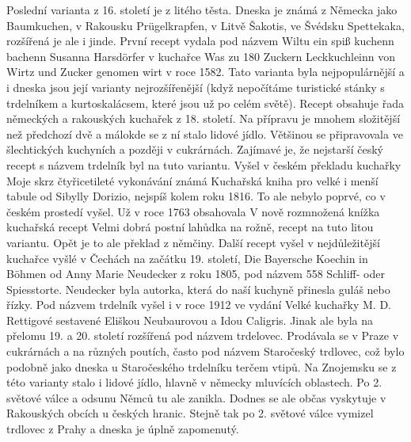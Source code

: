Poslední varianta z 16. století je z litého těsta. Dneska je známá z Německa jako Baumkuchen, v Rakousku Prügelkrapfen, v Litvě Šakotis, ve Švédsku Spettekaka, rozšířená je ale i jinde. První recept vydala pod názvem Wiltu ein spiß kuchenn bachenn Susanna Harsdörfer v kuchařce Was zu 180 Zuckern Leckkuchleinn von Wirtz und Zucker genomen wirt v roce 1582. Tato varianta byla nejpopulárnější a i dneska jsou její varianty nejrozšířenější (když nepočítáme turistické stánky s trdelníkem a kurtoskalácsem, které jsou už po celém světě).  Recept obsahuje řada německých a rakouských kuchařek z 18. století. Na přípravu je mnohem složitější než předchozí dvě a málokde se z ní stalo lidové jídlo. Většinou se připravovala ve šlechtických kuchyních a později v cukrárnách. Zajímavé je, že nejstarší český recept s názvem trdelník byl na tuto variantu. Vyšel v českém překladu kuchařky Moje skrz čtyřicetileté vykonávání známá Kuchařská kniha pro velké i menší tabule od Sibylly Dorizio, nejspíš kolem roku 1816. To ale nebylo poprvé, co v českém prostedí vyšel. Už v roce 1763 obsahovala V nově rozmnožená knížka kuchařská recept Velmi dobrá postní lahůdka na rožně, recept  na tuto litou variantu. Opět je to ale překlad z němčiny. Další recept vyšel v nejdůležitější kuchařce vyšlé v Čechách na začátku 19. století, Die Bayersche Koechin in Böhmen od Anny Marie Neudecker z roku 1805, pod názvem 558 Schliff- oder Spiesstorte. Neudecker byla autorka, která do naší kuchyně přinesla guláš nebo řízky. Pod názvem trdelník vyšel i v roce 1912 ve vydání Velké kuchařky M. D. Rettigové sestavené Eliškou Neubaurovou a Idou Caligris. Jinak ale byla na přelomu 19. a 20. století rozšířená pod názvem trdelovec. Prodávala se v Praze v cukrárnách a na různých poutích, často pod názvem Staročeský trdlovec, což bylo podobně jako dneska u Staročeského trdelníku terčem vtipů. Na Znojemsku se z této varianty stalo i lidové jídlo, hlavně v německy mluvících oblastech. Po 2. světové válce a odsunu Němců tu ale zanikla. Dodnes se ale občas vyskytuje v Rakouských obcích u českých hranic. Stejně tak po 2. světové válce vymizel trdlovec z Prahy a dneska je úplně zapomenutý.

